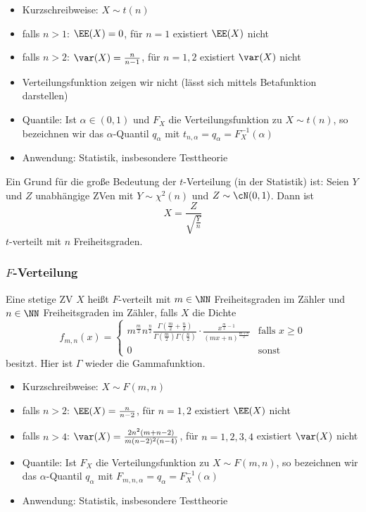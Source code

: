 \begin{itemize}
	\item Kurzschreibweise: $X\sim t(n)$
	\item falls $n>1$: $\EE(X)=0$, für $n=1$ existiert $\EE(X)$ nicht
	\item falls $n>2$: $\var(X)=\frac{n}{n-1}$, für $n=1,2$ existiert $\var(X)$ nicht
	\item Verteilungsfunktion zeigen wir nicht (lässt sich mittels Betafunktion darstellen)
	\item Quantile: Ist $\alpha \in (0,1)$ und $F_X$ die Verteilungsfunktion zu $X\sim t(n)$, so bezeichnen wir das $\alpha$-Quantil $q_\alpha$ mit $t_{n,\alpha}=q_\alpha=F_{X}^{-1}(\alpha)$
	\item Anwendung: Statistik, insbesondere Testtheorie
\end{itemize}

Ein Grund für die große Bedeutung der $ t $-Verteilung (in der Statistik) ist:
 Seien $ Y $ und $ Z $ unabhängige ZVen mit $ Y\sim \chi^{2} (n) $ und $ Z \sim \cN(0,1) $. Dann ist 
\[ X=\frac{Z}{\sqrt{\frac{Y}{n}}} \]
$ t $-verteilt mit $ n $ Freiheitsgraden.

\subsubsection{\texorpdfstring{$ F $}{F}-Verteilung}

 Eine stetige ZV $X$ heißt $F$-verteilt mit $m\in \NN$ Freiheitsgraden im Zähler und $n\in \NN$ Freiheitsgraden im Zähler, falls $X$ die Dichte
\[ f_{m,n}(x)=\begin{cases}
m^{\frac{m}{2}}n^{\frac{n}{2}}\frac{\Gamma\left(\frac{m}{2}+\frac{n}{2}\right)}{\Gamma\left(\frac{m}{2}\right)\Gamma\left(\frac{n}{2}\right)}\cdot \frac{x^{\frac{m}{2}-1}}{(mx+n)^{\frac{m+n}{2}}} & \text{falls }x\geq 0\\
0 & \text{sonst}
\end{cases} \] 
besitzt. Hier ist $\Gamma$ wieder die Gammafunktion.
\begin{itemize}
	\item Kurzschreibweise: $X\sim F(m,n)$
	\item falls $n>2$: $\EE(X)=\frac{n}{n-2}$, für $n=1,2$ existiert $\EE(X)$ nicht
	\item falls $n>4$: $\var(X)=\frac{2n^2(m+n-2)}{m(n-2)^2(n-4)}$, für $n=1,2,3,4$ existiert $\var(X)$ nicht
	\item Quantile: Ist $F_X$ die Verteilungsfunktion zu $X\sim F(m,n)$, so bezeichnen wir das $\alpha$-Quantil $q_\alpha$ mit $F_{m,n,\alpha}=q_\alpha=F_{X}^{-1}(\alpha)$
	\item Anwendung: Statistik, insbesondere Testtheorie
\end{itemize}

